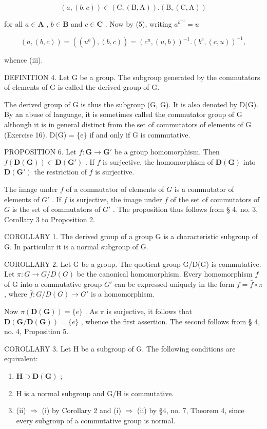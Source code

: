 \[
(a, (b, c)) \in (\mathrm{C}, (\mathrm{B}, \mathrm{A})). (\mathrm{B}, (\mathrm{C}, \mathrm{A}))
\]

for all \(a \in \mathbf{A}\) , \(b \in \mathbf{B}\) and \(c \in \mathbf{C}\) . Now by (5), writing \(a^{b^{-1}} = u\)

\[
(a, (b, c)) = ((u ^ {b}), (b, c)) = (c ^ {u}, (u, b)) ^ {- 1}. (b ^ {c}, (c, u)) ^ {- 1},
\]

whence (iii).

DEFINITION 4. Let G be a group. The subgroup generated by the commutators of elements of G is called the derived group of G.

The derived group of G is thus the subgroup (G, G). It is also denoted by D(G). By an abuse of language, it is sometimes called the commutator group of G although it is in general distinct from the set of commutators of elements of G (Exercise 16). D(G) = \{e\} if and only if G is commutative.

PROPOSITION 6. Let \(f: \mathbf{G} \to \mathbf{G}'\) be a group homomorphism. Then \(f(\mathbf{D}(\mathbf{G})) \subset \mathbf{D}(\mathbf{G}')\) . If \(f\) is surjective, the homomorphism of \(\mathbf{D}(\mathbf{G})\) into \(\mathbf{D}(\mathbf{G}')\) the restriction of \(f\) is surjective.

The image under \(f\) of a commutator of elements of \(G\) is a commutator of elements of \(G'\) . If \(f\) is surjective, the image under \(f\) of the set of commutators of \(G\) is the set of commutators of \(G'\) . The proposition thus follows from § 4, no. 3, Corollary 3 to Proposition 2.

COROLLARY 1. The derived group of a group G is a characteristic subgroup of G. In particular it is a normal subgroup of G.

COROLLARY 2. Let G be a group. The quotient group G/D(G) is commutative. Let \(\pi: G \to G/D(G)\) be the canonical homomorphism. Every homomorphism \(f\) of G into a commutative group \(G'\) can be expressed uniquely in the form \(f = \bar{f} \circ \pi\) , where \(\bar{f}: G/D(G) \to G'\) is a homomorphism.

Now \(\pi (\mathbf{D}(\mathbf{G})) = \{e\}\) . As \(\pi\) is surjective, it follows that \(\mathbf{D}(\mathbf{G} / \mathbf{D}(\mathbf{G})) = \{e\}\) , whence the first assertion. The second follows from § 4, no. 4, Proposition 5.

COROLLARY 3. Let H be a subgroup of G. The following conditions are equivalent:

\begin{enumerate}
\def\labelenumi{(\roman{enumi})}
\item
  \(\mathbf{H} \supset \mathbf{D}(\mathbf{G})\) ;
\item
  H is a normal subgroup and G/H is commutative.
\item
  (ii) \(\Rightarrow\) (i) by Corollary 2 and (i) \(\Rightarrow\) (ii) by §4, no. 7, Theorem 4, since every subgroup of a commutative group is normal.
\end{enumerate}

